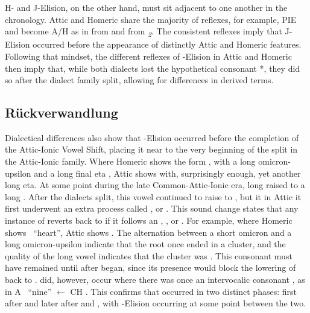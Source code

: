 H- and J-Elision, on the other hand, must sit adjacent to one another in the chronology. Attic and Homeric share the majority of reflexes,\autocite[198]{Smyth_2013} for example, PIE  and  become A/H  as in  from  and  from \textit{\textsubscript{2}}.\autocite[200]{Smyth_2013} The consistent reflexes imply that J-Elision occurred before the appearance of distinctly Attic and Homeric features. Following that mindset, the different reflexes of \W-Elision in Attic and Homeric then imply that, while both dialects lost the hypothetical consonant *\w, they did so after the dialect family split, allowing for differences in derived terms.

\subsection{R\"uckverwandlung}
Dialectical differences also show that \W-Elision occurred before the completion of the Attic-Ionic Vowel Shift, placing it near to the very beginning of the split in the Attic-Ionic family. Where Homeric shows the form , with a long omicron-upsilon  and a long final eta , Attic shows  with, surprisingly enough, yet another long eta. At some point during the late Common-Attic-Ionic era, long  raised to a long \hellenic{/*\ae:/}. After the dialects split, this vowel continued to raise to , but it in Attic it first underwent an extra process called , or . This sound change states that any instance of \hellenic{/*\ae:/} reverts back to  if it follows an , , or . For example, where Homeric shows \ ``heart'', Attic shows . The alternation between a short omicron  and a long omicron-upsilon  indicate that the root once ended in a cluster, and the quality of the long vowel indicates that the cluster was . This consonant must have remained until after  began, since its presence would block the lowering of  back to .  did, however, occur where there was once an intervocalic consonant \hellenic{*\w}, as in A \ ``nine'' $\gets$ CH .\autocite[ἐννέα]{Beekes_2009} This confirms that  occurred in two distinct phases: first after  and later after  and , with \W-Elision occurring at some point between the two.

